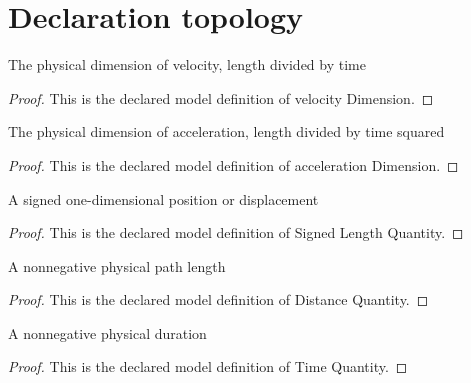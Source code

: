 \section{Declaration topology}
\begin{definition}
  \label{def:physics:phyx-mini-0670:phyxminiproblems-problemphyxmini0670-velocitydimension}
  The physical dimension of velocity, length divided by time
\end{definition}
\begin{proof}
  This is the declared model definition of velocity Dimension.
\end{proof}
\begin{definition}
  \label{def:physics:phyx-mini-0670:phyxminiproblems-problemphyxmini0670-accelerationdimension}
  The physical dimension of acceleration, length divided by time squared
\end{definition}
\begin{proof}
  This is the declared model definition of acceleration Dimension.
\end{proof}
\begin{definition}
  \label{def:physics:phyx-mini-0670:phyxminiproblems-problemphyxmini0670-signedlengthquantity}
  A signed one-dimensional position or displacement
\end{definition}
\begin{proof}
  This is the declared model definition of Signed Length Quantity.
\end{proof}
\begin{definition}
  \label{def:physics:phyx-mini-0670:phyxminiproblems-problemphyxmini0670-distancequantity}
  A nonnegative physical path length
\end{definition}
\begin{proof}
  This is the declared model definition of Distance Quantity.
\end{proof}
\begin{definition}
  \label{def:physics:phyx-mini-0670:phyxminiproblems-problemphyxmini0670-timequantity}
  A nonnegative physical duration
\end{definition}
\begin{proof}
  This is the declared model definition of Time Quantity.
\end{proof}
